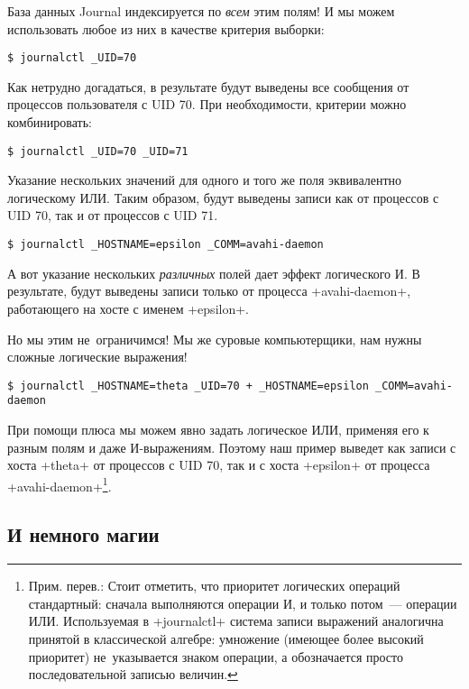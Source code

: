 \documentclass[10pt,oneside,a4paper]{article}
\begin{document}
База данных Journal индексируется по \emph{всем} этим полям! И мы можем
использовать любое из них в качестве критерия выборки:
\begin{Verbatim}
$ journalctl _UID=70
\end{Verbatim}
Как нетрудно догадаться, в результате будут выведены все сообщения от
процессов пользователя с UID 70. При необходимости, критерии можно
комбинировать:
\begin{Verbatim}
$ journalctl _UID=70 _UID=71
\end{Verbatim}
Указание нескольких значений для одного и того же поля эквивалентно логическому
ИЛИ.  Таким образом, будут выведены записи как от процессов с UID 70, так и от
процессов с UID 71.
\begin{Verbatim}
$ journalctl _HOSTNAME=epsilon _COMM=avahi-daemon
\end{Verbatim}
А вот указание нескольких \emph{различных} полей дает эффект логического И. В
результате, будут выведены записи только от процесса +avahi-daemon+, работающего
на хосте с именем +epsilon+.

Но мы этим не~ограничимся! Мы же суровые компьютерщики, нам нужны сложные
логические выражения!
\begin{Verbatim}
$ journalctl _HOSTNAME=theta _UID=70 + _HOSTNAME=epsilon _COMM=avahi-daemon
\end{Verbatim}
При помощи плюса мы можем явно задать логическое ИЛИ, применяя его к разным
полям и даже И-выражениям. Поэтому наш пример выведет как записи с хоста
+theta+ от процессов с UID 70, так и с хоста +epsilon+ от процесса
+avahi-daemon+\footnote{Прим. перев.: Стоит отметить, что приоритет логических
операций стандартный: сначала выполняются операции И, и только потом~---
операции ИЛИ. Используемая в +journalctl+ система записи выражений аналогична
принятой в классической алгебре: умножение (имеющее более высокий приоритет)
не~указывается знаком операции, а обозначается просто последовательной
записью величин.}.

\subsection{И немного магии}
\end{document}

